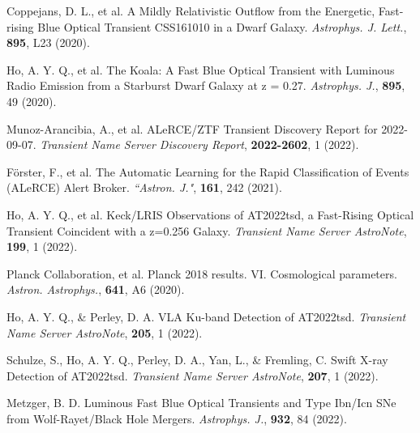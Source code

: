 \documentclass{nature_plusfigure}
\newcommand{\mn}{{Mon. Not. R. Astron. Soc.}}
\newcommand{\mnras}{\mn}
\newcommand{\aj}{{``Astron. J."}}
\newcommand{\apj}{{Astrophys. J.}}
\newcommand{\apjl}{{Astrophys. J. Lett.}}
\newcommand{\aap}{{Astron. Astrophys.}}
\newcommand{\pasp}{{Pub. Ast. Soc. Pac.}}
\begin{document}
\begin{thebibliography}{100}
 Coppejans, D. L., et al. A Mildly Relativistic Outflow from the Energetic, Fast-rising Blue Optical Transient CSS161010 in a Dwarf Galaxy. \emph{\apjl}, \textbf{895}, L23 (2020). 

 Ho, A. Y. Q., et al. The Koala: A Fast Blue Optical Transient with Luminous Radio Emission from a Starburst Dwarf Galaxy at z = 0.27. \emph{\apj}, \textbf{895}, 49 (2020). 


 Munoz-Arancibia, A., et al. ALeRCE/ZTF Transient Discovery Report for 2022-09-07. \emph{Transient Name Server Discovery Report}, \textbf{2022-2602}, 1 (2022). 

 Förster, F., et al. The Automatic Learning for the Rapid Classification of Events (ALeRCE) Alert Broker. \emph{\aj}, \textbf{161}, 242 (2021). 

 Ho, A. Y. Q., et al. Keck/LRIS Observations of AT2022tsd, a Fast-Rising Optical Transient Coincident with a z=0.256 Galaxy. \emph{Transient Name Server AstroNote}, \textbf{199}, 1 (2022). 

 Planck Collaboration, et al. Planck 2018 results. VI. Cosmological parameters. \emph{\aap}, \textbf{641}, A6 (2020). 

 Ho, A. Y. Q., \& Perley, D. A. VLA Ku-band Detection of AT2022tsd. \emph{Transient Name Server AstroNote}, \textbf{205}, 1 (2022). 

 Schulze, S., Ho, A. Y. Q., Perley, D. A., Yan, L., \& Fremling, C. Swift X-ray Detection of AT2022tsd. \emph{Transient Name Server AstroNote}, \textbf{207}, 1 (2022). 

 Metzger, B. D. Luminous Fast Blue Optical Transients and Type Ibn/Icn SNe from Wolf-Rayet/Black Hole Mergers. \emph{\apj}, \textbf{932}, 84 (2022). 






\end{thebibliography}
\end{document}
